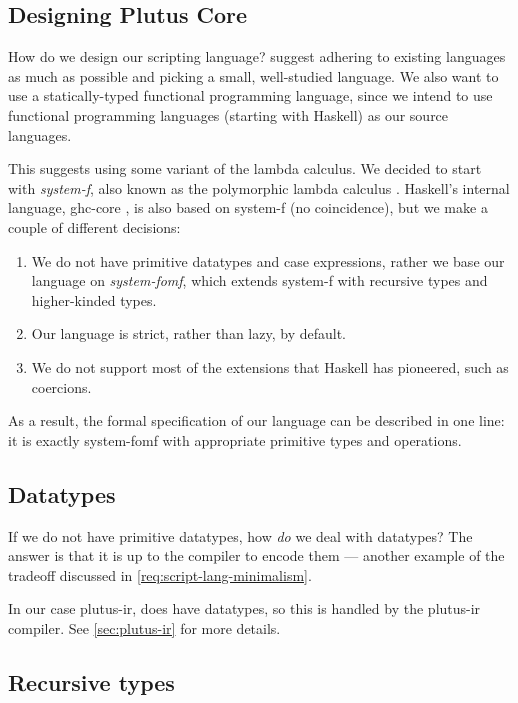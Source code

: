 \subsection{Designing Plutus Core}

How do we design our scripting language?
 suggest adhering to existing languages as much as possible and picking a small, well-studied language.
We also want to use a statically-typed functional programming language, since we intend to use functional programming languages (starting with Haskell) as our source languages.

This suggests using some variant of the lambda calculus.
We decided to start with \emph{\gls{system-f}}, also known as the polymorphic lambda calculus \autocite{Girard-thesis}.
Haskell's internal language, \gls{ghc-core} \parencite{jones1998transformation}, is also based on \gls{system-f} (no coincidence), but we make a couple of different decisions:
\begin{enumerate}
  \item We do not have primitive datatypes and case expressions, rather we base our language on \emph{\gls{system-fomf}}, which extends \gls{system-f} with recursive types and higher-kinded types.
  \item Our language is strict, rather than lazy, by default.
  \item We do not support most of the extensions that Haskell has pioneered, such as coercions.
\end{enumerate}

As a result, the formal specification of our language can be described in one line: it is exactly \gls{system-fomf} with appropriate primitive types and operations.


\subsection{Datatypes}
If we do not have primitive datatypes, how \emph{do} we deal with datatypes?
The answer is that it is up to the compiler to encode them --- another example of the tradeoff discussed in \cref{req:script-lang-minimalism}.

In our case \gls{plutus-ir}, does have datatypes, so this is handled by the \gls{plutus-ir} compiler. See \cref{sec:plutus-ir} for more details.

\subsection{Recursive types}

